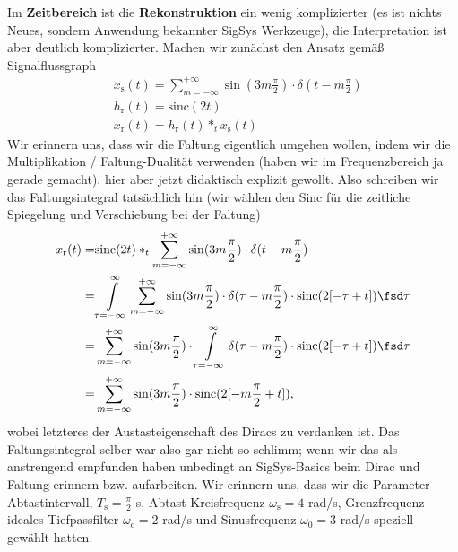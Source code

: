 \begin{Loesung}
Im \textbf{Zeitbereich} ist die \textbf{Rekonstruktion} ein wenig komplizierter (es ist
nichts Neues, sondern Anwendung bekannter SigSys Werkzeuge), die Interpretation
ist aber deutlich komplizierter.
Machen wir zunächst den Ansatz gemäß Signalflussgraph
\begin{align}
&x_\mathrm{s}(t) =
\sum_{m=-\infty}^{+\infty} \sin(3 m \frac{\pi}{2}) \cdot \delta(t-m \frac{\pi}{2})\\
&h_\mathrm{r}(t) = \mathrm{sinc}(2 t)\\
&x_\mathrm{r}(t) = h_\mathrm{r}(t) \ast_t x_\mathrm{s}(t)
\end{align}
Wir erinnern uns, dass wir die Faltung eigentlich umgehen wollen, indem
wir die Multiplikation / Faltung-Dualität verwenden (haben wir im Frequenzbereich
ja gerade gemacht), hier aber jetzt didaktisch explizit gewollt.
Also schreiben wir das Faltungsintegral tatsächlich hin
(wir wählen den Sinc für die zeitliche Spiegelung und Verschiebung bei der Faltung)
\begin{align}
x_\mathrm{r}(t) =&
\mathrm{sinc}(2 t)
\ast_t
\sum_{m=-\infty}^{+\infty} \sin(3 m \frac{\pi}{2}) \cdot \delta(t-m \frac{\pi}{2})\\
=&
\int\limits_{\tau = -\infty}^{\infty}
\sum_{m=-\infty}^{+\infty} \sin(3 m \frac{\pi}{2}) \cdot \delta(\tau-m \frac{\pi}{2})
\cdot \mathrm{sinc}(2 [-\tau + t]) \fsd \tau\\
=&
\sum_{m=-\infty}^{+\infty} \sin(3 m \frac{\pi}{2}) \cdot
\int\limits_{\tau = -\infty}^{\infty} \delta(\tau-m \frac{\pi}{2})
\cdot \mathrm{sinc}(2 [-\tau + t]) \fsd \tau\\
=&
\sum_{m=-\infty}^{+\infty} \sin(3 m \frac{\pi}{2}) \cdot \mathrm{sinc}(2 [-m \frac{\pi}{2} + t]),
\label{eq:EF235EE3D8_SincSpecialResult}
\end{align}
wobei letzteres der Austasteigenschaft des Diracs zu verdanken ist.
Das Faltungsintegral selber war also gar nicht so schlimm; wenn wir das als anstrengend
empfunden haben unbedingt an SigSys-Basics beim Dirac und Faltung erinnern bzw. aufarbeiten.
%
Wir erinnern uns, dass wir die Parameter Abtastintervall, $T_\mathrm{s}=\frac{\pi}{2}$ s,
Abtast-Kreisfrequenz $\omega_\mathrm{s}=4$  rad/s, Grenzfrequenz ideales
Tiefpassfilter $\omega_\mathrm{c} = 2$ rad/s und Sinusfrequenz $\omega_0=3$ rad/s
speziell gewählt hatten.
\end{Loesung}
%
%

